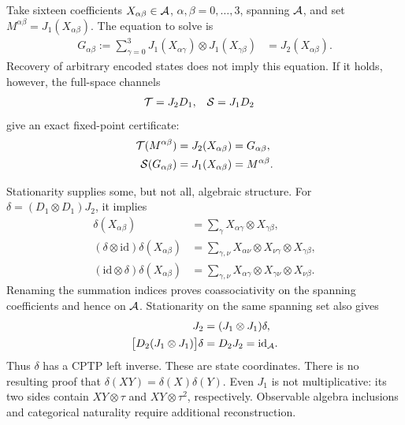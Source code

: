 \documentclass[aps,pra,reprint,nofootinbib,onecolumn]{revtex4-2}
\begin{document}
Take sixteen coefficients $X_{\alpha\beta}\in\mathcal{A}$,
$\alpha,\beta=0,\ldots,3$, spanning $\mathcal{A}$, and set
$M^{\alpha\beta}=J_1(X_{\alpha\beta})$. The equation to solve is
\begin{align}
	G_{\alpha\beta}:=
	\sum_{\gamma=0}^{3}
	J_1(X_{\alpha\gamma})\otimes J_1(X_{\gamma\beta})
	 & =J_2(X_{\alpha\beta}).
	\label{eq:stationarity}
\end{align}
Recovery of arbitrary encoded states does not imply this equation.
If it holds, however, the full-space channels
\begin{align}
	\mathcal{T} & =J_2D_1, & \mathcal{S} & =J_1D_2
\end{align}
give an exact fixed-point certificate:
\begin{align}
	\mathcal{T}(M^{\alpha\beta})
	 & =J_2(X_{\alpha\beta})=G_{\alpha\beta},
	\nonumber                                 \\
	\mathcal{S}(G_{\alpha\beta})
	 & =J_1(X_{\alpha\beta})=M^{\alpha\beta}.
	\label{eq:certificate}
\end{align}

Stationarity supplies some, but not all, algebraic structure.
For $\delta=(D_1\otimes D_1)J_2$, it implies
\begin{align}
	\delta(X_{\alpha\beta})
	 & =\sum_\gamma X_{\alpha\gamma}\otimes X_{\gamma\beta},
	\nonumber                                                \\
	(\delta\otimes\mathrm{id})\delta(X_{\alpha\beta})
	 & =\sum_{\gamma,\nu}
	X_{\alpha\nu}\otimes X_{\nu\gamma}\otimes X_{\gamma\beta},
	\nonumber                                                \\
	(\mathrm{id}\otimes\delta)\delta(X_{\alpha\beta})
	 & =\sum_{\gamma,\nu}
	X_{\alpha\gamma}\otimes X_{\gamma\nu}\otimes X_{\nu\beta}.
	\label{eq:state-coproduct}
\end{align}
Renaming the summation indices proves coassociativity on the spanning
coefficients and hence on $\mathcal{A}$. Stationarity on the same spanning
set also gives
\begin{align}
	J_2 & =(J_1\otimes J_1)\delta,     \\
	\bigl[D_2(J_1\otimes J_1)\bigr]\delta
	    & =D_2J_2=\mathrm{id}_{\mathcal{A}}.
\end{align}
Thus $\delta$ has a CPTP left inverse. These are state coordinates.
There is no resulting proof that
$\delta(XY)=\delta(X)\delta(Y)$. Even $J_1$ is not multiplicative:
its two sides contain $XY\otimes\tau$ and $XY\otimes\tau^2$,
respectively. Observable algebra inclusions and categorical naturality
require additional reconstruction.
\end{document}

